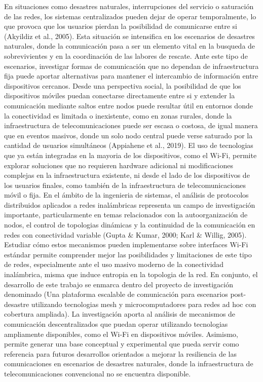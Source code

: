 En situaciones como desastres naturales, interrupciones del servicio o saturación de las redes, los sistemas centralizados pueden dejar de operar temporalmente, lo que provoca que los usuarios pierdan la posibilidad de comunicarse entre si (Akyildiz et al., 2005). Esta situación se intensifica en los escenarios de desastres naturales, donde la comunicación pasa a ser un elemento vital en la busqueda de sobrevivientes y en la coordinación de las labores de rescate. Ante este tipo de escenarios, investigar formas de comunicación que no dependan de infraestructura fija puede aportar alternativas para mantener el intercambio de información entre dispositivos cercanos. Desde una perspectiva social, la posibilidad de que los dispositivos móviles puedan conectarse directamente entre si y extender la comunicación mediante saltos entre nodos puede resultar útil en entornos donde la conectividad es limitada o inexistente, como en zonas rurales, donde la infraestructura de telecomunicaciones puede ser escasa o costosa, de igual manera que en eventos masivos, donde un solo nodo central puede verse saturado por la cantidad de usuarios simultáneos (Appiahene et al., 2019). El uso de tecnologias que ya están integradas en la mayoria de los dispositivos, como el Wi-Fi, permite explorar soluciones que no requieren hardware adicional ni modificaciones complejas en la infraestructura existente, ni desde el lado de los dispositivos de los usuarios finales, como también de la infraestructura de telecomunicaciones móvil o fija. En el ámbito de la ingenieria de sistemas, el análisis de protocolos distribuidos aplicados a redes inalámbricas representa un campo de investigación importante, particularmente en temas relacionados con la autoorganización de nodos, el control de topologias dinámicas y la continuidad de la comunicación en redes con conectividad variable (Gupta \& Kumar, 2000; Karl \& Willig, 2005). Estudiar cómo estos mecanismos pueden implementarse sobre interfaces Wi-Fi estándar permite comprender mejor las posibilidades y limitaciones de este tipo de redes, especialmente ante el uso masivo moderno de la conectividad inalámbrica, misma que induce entropia en la topologia de la red. En conjunto, el desarrollo de este trabajo se enmarca dentro del proyecto de investigación denominado (Una plataforma escalable de comunicación para escenarios post-desastre utilizando tecnologias mesh y microcomputadores para redes ad hoc con cobertura ampliada). La investigación aporta al análisis de mecanismos de comunicación descentralizados que puedan operar utilizando tecnologias ampliamente disponibles, como el Wi-Fi en dispositivos móviles. Asimismo, permite generar una base conceptual y experimental que pueda servir como referencia para futuros desarrollos orientados a mejorar la resiliencia de las comunicaciones en escenarios de desastres naturales, donde la infraestructura de telecomunicaciones convencional no se encuentra disponible.


